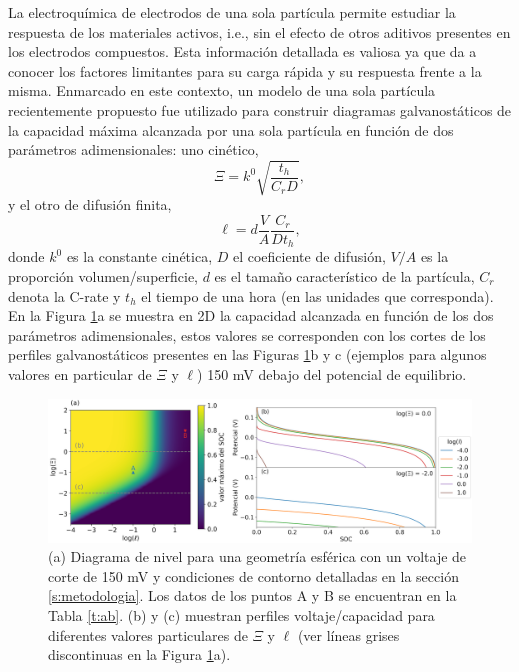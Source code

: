 La electroquímica de electrodos de una sola partícula \cite{ventosa2021, 
heubner2020, takahashi2020, wahab2020, xu2020, tao2019, fukui2011} permite 
estudiar la respuesta  de los materiales activos, i.e., sin el efecto 
de otros aditivos presentes en los electrodos compuestos. Esta información 
detallada es valiosa ya que da a conocer los factores limitantes para su 
carga rápida y su respuesta frente a la misma. Enmarcado en este contexto, un 
modelo de una sola partícula recientemente propuesto \cite{gavilan2023} fue 
utilizado para construir diagramas galvanostáticos de la capacidad máxima 
alcanzada por una sola partícula en función de dos parámetros adimensionales: uno
cinético,
\begin{equation}\label{eq:xi}
    \Xi = k^0 \sqrt{\frac{t_h}{C_r D}},
\end{equation}
y el otro de difusión finita,
\begin{equation}\label{eq:ele}
    \ell = d \frac{V}{A} \frac{C_r}{D t_h},
\end{equation}
donde $k^0$ es la constante cinética, $D$ el coeficiente de difusión, $V/A$ es la 
proporción volumen/superficie, $d$ es el tamaño característico de la partícula, 
$C_r$ denota la C-rate y $t_h$ el tiempo de una hora (en las unidades que
corresponda). En la Figura \ref{fig:diagnostico}a se muestra en 2D la 
capacidad alcanzada en función de los dos parámetros adimensionales, estos valores 
se corresponden con los cortes de los perfiles galvanostáticos presentes en las
Figuras \ref{fig:diagnostico}b y c (ejemplos para algunos valores en particular 
de $\Xi$ y $\ell$) 150 mV debajo del potencial de equilibrio.

\begin{figure}[h!]
    \centering
    \includegraphics[width=\textwidth]{FastCharging/un/introduccion/diagnosis-merged.png}
    \caption{(a) Diagrama de nivel para una geometría esférica con un voltaje de 
    corte de 150 mV y condiciones de contorno detalladas en la sección 
    \ref{s:metodologia}. Los datos de los puntos A y B se encuentran en la 
    Tabla \ref{t:ab}. (b) y (c) muestran perfiles voltaje/capacidad para 
    diferentes valores particulares de $\Xi$ y $\ell$ (ver líneas grises 
    discontinuas en la Figura \ref{fig:diagnostico}a).}
    \label{fig:diagnostico}
\end{figure}


